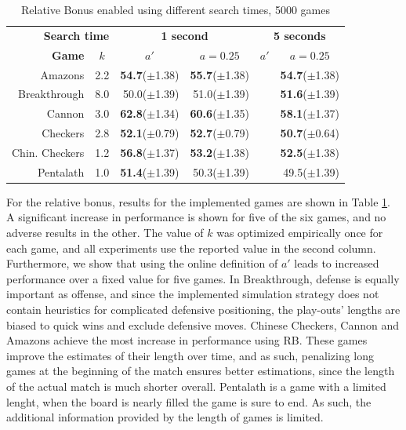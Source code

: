 \documentclass{ecai2014}
\begin{document}
\begin{table}
{\caption{Relative Bonus enabled using different search times, 5000 games} \label{tab:rb}}
\begin{center}
\begin{tabular}{rlrrrr}
\hline
\multicolumn{2}{r}{\rule{0pt}{12pt}\textbf{Search time}} & \multicolumn{2}{c}{\textbf{1 second}} & \multicolumn{2}{c}{\textbf{5 seconds}} \\
\cline{1-6}
\rule{0pt}{12pt}
\textbf{Game} & \multicolumn{1}{c|}{\textbf{$k$}} 
& \multicolumn{1}{c}{\textbf{$a'$}} & \multicolumn{1}{c}{\textbf{$a = 0.25$}} & \multicolumn{1}{c}{\textbf{$a'$}} & \multicolumn{1}{c}{\textbf{$a = 0.25$}} \\ \hline
Amazons &\multicolumn{1}{l|}{2.2}			& {\bf{54.7}}($\pm$1.38) & {\bf{55.7}}($\pm$1.38) 	& & {\bf{54.7}}($\pm$1.38) \\ 
Breakthrough &\multicolumn{1}{l|}{8.0} 		& 50.0($\pm$1.39)		 & 51.0($\pm$1.39) 			& & {\bf{51.6}}($\pm$1.39) \\ 
Cannon &\multicolumn{1}{l|}{3.0} 			& {\bf{62.8}}($\pm$1.34) & {\bf{60.6}}($\pm$1.35) 	& & {\bf{58.1}}($\pm$1.37) \\ 
Checkers &\multicolumn{1}{l|}{2.8}			& {\bf{52.1}}($\pm$0.79) & {\bf{52.7}}($\pm$0.79) 	& & {\bf{50.7}}($\pm$0.64) \\ 
Chin. Checkers &\multicolumn{1}{l|}{1.2} 	& {\bf{56.8}}($\pm$1.37) & {\bf{53.2}}($\pm$1.38) 	& & {\bf{52.5}}($\pm$1.38) \\
Pentalath &\multicolumn{1}{l|}{1.0} 		& {\bf{51.4}}($\pm$1.39) & 50.3($\pm$1.39) 			& & 49.5($\pm$1.39) 		\\
\hline
\end{tabular}
\end{center}
\end{table}
For the relative bonus, results for the implemented games are shown in Table \ref{tab:rb}. A significant increase in performance is shown for five of the six games, and no adverse results in the other. The value of $k$ was optimized empirically once for each game, and all experiments use the reported value in the second column. Furthermore, we show that using the online definition of $a'$ leads to increased performance over a fixed value for five games. In Breakthrough, defense is equally important as offense, and since the implemented simulation strategy does not contain heuristics for complicated defensive positioning, the play-outs' lengths are biased to quick wins and exclude defensive moves.
Chinese Checkers, Cannon and Amazons achieve the most increase in performance using RB. These games improve the estimates of their length over time, and as such, penalizing long games at the beginning of the match ensures better estimations, since the length of the actual match is much shorter overall. Pentalath is a game with a limited lenght, when the board is nearly filled the game is sure to end. As such, the additional information provided by the length of games is limited.
\end{document}
